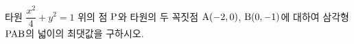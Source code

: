 타원 $\dfrac{x^2}{4}+y^2=1$ 위의 점 $\mathrm{P}$와 타원의 두 꼭짓점 $\mathrm{A}(-2{,}\mkern3mu\mathopen{}0)$, $\mathrm{B}(0{,}\mkern3mu\mathopen{}-1)$에 대하여 삼각형 $\mathrm{PAB}$의 넓이의 최댓값을 구하시오.
